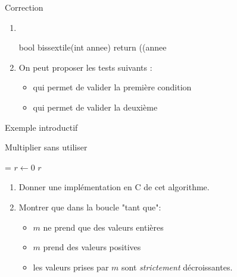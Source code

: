 \documentclass[10pt,french]{beamer}
\begin{document}
\begin{frame}[fragile]{\Ctitle}{\stitle}
\begin{exampleblock}{Correction}
	\begin{enumerate}
	\item<1-> \ \\
	\begin{langageC}
bool bissextile(int annee) {
	return ((annee%
}
	\end{langageC}
	\item<2-> On peut proposer les tests suivants :
	\begin{itemize}
		\item<3->  qui permet de valider la première condition
		\item<4->  qui permet de valider la deuxième
	\end{itemize}
\end{enumerate}
\end{exampleblock}
\end{frame}

\begin{frame}[fragile]{\Ctitle}{\stitle}
	\begin{block}{Exemple introductif}
	\SetAlFnt{\small}
	\setlength{\algomargin}{8pt}
	\begin{algorithm}[H]
		\DontPrintSemicolon
		\caption{Multiplier sans utiliser {\tt *}}
		\everypar={\footnotesize \textcolor{gray}{\nl}}
		$r \leftarrow 0$\;
		\Return $r$
	  \end{algorithm}
	  \begin{enumerate}
	  \item<2-> Donner une implémentation en C de cet algorithme.
	  \item<3-> Montrer que dans la boucle "tant que":
	  \begin{itemize}
		\item<3-> $m$ ne prend que des valeurs entières
		\item<4-> $m$ prend des valeurs positives
		\item<5-> les valeurs prises par $m$ sont \textit{strictement} décroissantes.
	  \end{itemize}
	  \end{enumerate}
	\end{block}
\end{frame}
\end{document}
